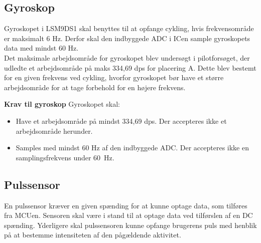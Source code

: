 \subsection{Gyroskop} \label{krav:gyro}
Gyroskopet i LSM9DS1 skal benyttes til at opfange cykling, hvis frekvensområde er maksimalt 6 Hz. Derfor skal den indbyggede ADC i ICen sample gyroskopets data med mindst 60 Hz. \\
Det maksimale arbejdsområde for gyroskopet blev undersøgt i pilotforsøget, der udledte et arbejdsområde på maks 334,69 dps for placering A. Dette blev bestemt for en given frekvens ved cykling, hvorfor gyroskopet bør have et større arbejdsområde for at tage forbehold for en højere frekvens. %

\textbf{Krav til gyroskop} \newline
Gyroskopet skal:
\begin{itemize}
\item Have et arbejdsområde på mindst 334,69 dps. Der accepteres ikke et arbejdsområde herunder.
\item Samples med mindst 60 Hz af den indbyggede ADC. Der accepteres ikke en samplingsfrekvens under 60~Hz.
\end{itemize}

\subsection{Pulssensor} \label{puls_krav}
En pulssensor kræver en given spænding for at kunne optage data, som tilføres fra MCUen. Sensoren skal være i stand til at optage data ved tilførslen af en DC spænding. %
Yderligere skal pulssensoren kunne opfange brugerens puls med henblik på at bestemme intensiteten af den pågældende aktivitet.

